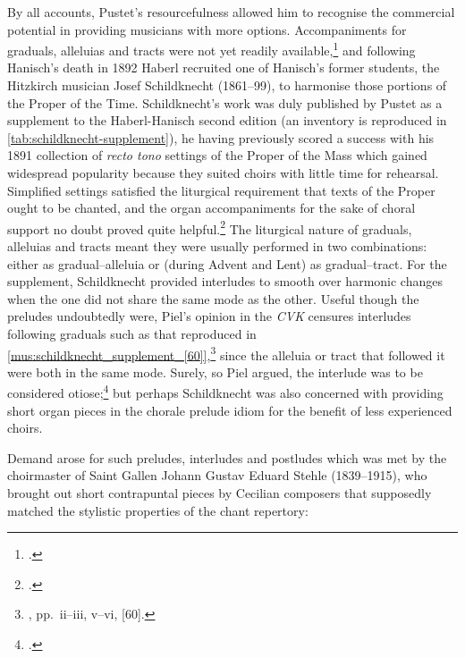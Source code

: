 By all accounts, Pustet's resourcefulness allowed him to recognise the commercial potential in providing musicians with more options.
Accompaniments for graduals, alleluias and tracts were not yet readily available,\footnote{.} and following Hanisch's death in 1892 Haberl recruited one of Hanisch's former students, the Hitzkirch musician Josef Schildknecht (1861--99), to harmonise those portions of the Proper of the Time.
Schildknecht's work was duly published by Pustet as a supplement to the Haberl-Hanisch second edition (an inventory is reproduced in \cref{tab:schildknecht-supplement}), he having previously scored a success with his 1891 collection of \emph{recto tono} settings of the Proper of the Mass which gained widespread popularity because they suited choirs with little time for rehearsal.
Simplified settings satisfied the liturgical requirement that texts of the Proper ought to be chanted, and the organ accompaniments for the sake of choral support no doubt proved quite helpful.\footcites[`Vorwort und Empfehlung von Arnold Walther' in][p.~ii]{Schildknecht178Kadenzenfuer1891}[Cited in][64--5]{HornbachnerOrgelbewegungundOrgellehre2013}
The liturgical nature of graduals, alleluias and tracts meant they were usually performed in two combinations: either as gradual--alleluia or (during Advent and Lent) as gradual--tract.
%
For the supplement, Schildknecht provided interludes to smooth over harmonic changes when the one did not share the same mode as the other.
Useful though the preludes undoubtedly were, Piel's opinion in the \emph{CVK} censures interludes following graduals such as that reproduced in \cref{mus:schildknecht_supplement_[60]},\footnote{\cite{SchildknechtOrganumcomitansad1892}, pp.~ii--iii, v--vi, [60].} since the alleluia or tract that followed it were both in the same mode.
Surely, so Piel argued, the interlude was to be considered otiose;\footnote{.} but perhaps Schildknecht was also concerned with providing short organ pieces in the chorale prelude idiom for the benefit of less experienced choirs.
%

Demand arose for such preludes, interludes and postludes which was met by the choirmaster of Saint Gallen Johann Gustav Eduard Stehle (1839--1915), who brought out short contrapuntal pieces by Cecilian composers that supposedly matched the stylistic properties of the chant repertory:
\noclub[2]

